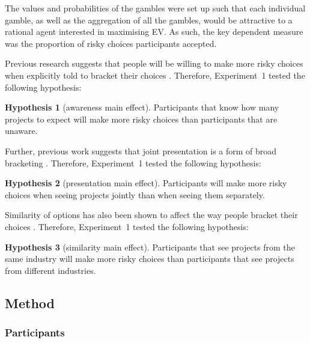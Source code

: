 \documentclass[a4paper, nobind]{templates/ociamthesis}
\theoremstyle{definition}
\theoremstyle{definition}
\theoremstyle{definition}
\theoremstyle{definition}
\newtheorem{hypothesis}{Hypothesis}[chapter]
\theoremstyle{remark}
\begin{document}
The values and probabilities of the gambles were set up such that each
individual gamble, as well as the aggregation of all the gambles, would be
attractive to a rational agent interested in maximising EV. As such, the key
dependent measure was the proportion of risky choices participants accepted.

Previous research suggests that people will be willing to make more risky
choices when explicitly told to bracket their choices \autocite{sokolhessner2009,sokolhessner2012}. Therefore, Experiment~1 tested the following hypothesis:

\begin{hypothesis}[awareness main effect]
\protect\hypertarget{hyp:awareness-aggregation-1}{}{\label{hyp:awareness-aggregation-1} \iffalse (awareness main effect) \fi{} }Participants that know how many projects to expect will make more risky choices
than participants that are unaware.
\end{hypothesis}

Further, previous work suggests that joint presentation is a form of broad
bracketing \autocites[e.g.,][]{moher2010,hsee1999}. Therefore, Experiment~1 tested the
following hypothesis:

\begin{hypothesis}[presentation main effect]
\protect\hypertarget{hyp:presentation-aggregation-1}{}{\label{hyp:presentation-aggregation-1} \iffalse (presentation main effect) \fi{} }Participants will make more risky choices when seeing projects jointly than when
seeing them separately.
\end{hypothesis}

Similarity of options has also been shown to affect the way people bracket their
choices \autocite[e.g.,][]{dekay2005}. Therefore, Experiment~1 tested the following hypothesis:

\begin{hypothesis}[similarity main effect]
\protect\hypertarget{hyp:similarity-aggregation-1}{}{\label{hyp:similarity-aggregation-1} \iffalse (similarity main effect) \fi{} }Participants that see projects from the same industry will make more risky
choices than participants that see projects from different industries.
\end{hypothesis}

\subsection{Method}

\subsubsection{Participants}
\end{document}
